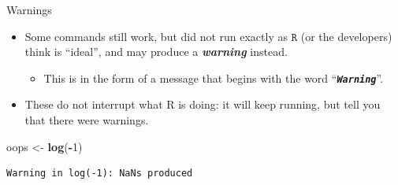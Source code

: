 \documentclass[
  11pt,
  ignorenonframetext,
]{beamer}
\newcommand{\VERB}{\Verb[commandchars=\\\{\}]}
\newenvironment{Shaded}{\begin{snugshade}}{\end{snugshade}}
\newcommand{\DecValTok}[1]{\textcolor[rgb]{0.00,0.00,0.81}{#1}}
\newcommand{\FunctionTok}[1]{\textcolor[rgb]{0.13,0.29,0.53}{\textbf{#1}}}
\newcommand{\NormalTok}[1]{#1}
\newcommand{\OtherTok}[1]{\textcolor[rgb]{0.56,0.35,0.01}{#1}}
\newcommand{\SpecialCharTok}[1]{\textcolor[rgb]{0.81,0.36,0.00}{\textbf{#1}}}
\newcommand{\WarningTok}[1]{\textcolor[rgb]{0.56,0.35,0.01}{\textbf{\textit{#1}}}}
\providecommand{\tightlist}{%
  \setlength{\itemsep}{0pt}\setlength{\parskip}{0pt}}
\begin{document}
\begin{frame}[fragile]{Warnings}
\protect\hypertarget{warnings}{}
\begin{itemize}
\tightlist
\item
  Some commands still work, but did not run exactly as \(\texttt{R}\)
  (or the developers) think is ``ideal'', and may produce a
  \textbf{\emph{warning}} instead.

  \begin{itemize}
  \tightlist
  \item
    This is in the form of a message that begins with the word
    ``\WarningTok{\texttt{Warning}}''.
  \end{itemize}
\item
  These do not interrupt what R is doing: it will keep running, but tell
  you that there were warnings.

\end{itemize}

\begin{Shaded}
\begin{Highlighting}[]
\NormalTok{oops }\OtherTok{\textless{}{-}} \FunctionTok{log}\NormalTok{(}\SpecialCharTok{{-}}\DecValTok{1}\NormalTok{)}
\end{Highlighting}
\end{Shaded}

\begin{verbatim}
Warning in log(-1): NaNs produced
\end{verbatim}
\end{frame}
\end{document}
